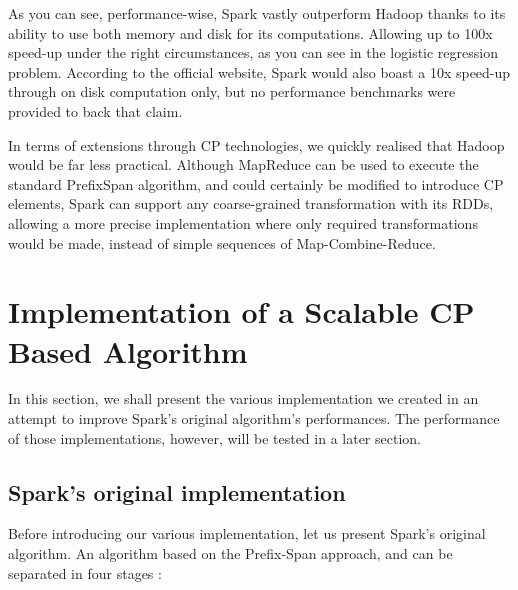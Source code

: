\documentclass{eplmastersthesis}
\begin{document}
As you can see, performance-wise, Spark vastly outperform Hadoop thanks to its ability to use both memory and disk for its computations. Allowing up to 100x speed-up under the right circumstances, as you can see in the logistic regression problem. According to the official website, Spark would also boast a 10x speed-up through on disk computation only, but no performance benchmarks were provided to back that claim. \newline

In terms of extensions through CP technologies, we quickly realised that Hadoop would be far less practical. Although MapReduce can be used to execute the standard PrefixSpan algorithm, and could certainly be modified to introduce CP elements, Spark can support any coarse-grained transformation with its RDDs, allowing a more precise implementation where only required transformations would be made, instead of simple sequences of Map-Combine-Reduce. \newline

\section{Implementation of a Scalable CP Based Algorithm}

In this section, we shall present the various implementation we created in an attempt to improve Spark's original algorithm's performances. The performance of those implementations, however, will be tested in a later section.

\subsection{Spark's original implementation}

Before introducing our various implementation, let us present Spark's original algorithm. An algorithm based on the Prefix-Span approach, and can be separated in four stages :
\end{document}
